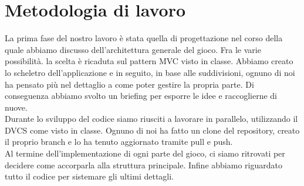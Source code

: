 \documentclass[a4paper,12pt]{report}
\begin{document}
\section{Metodologia di lavoro}
La prima fase del nostro lavoro è stata quella di progettazione nel corso della quale abbiamo discusso dell'architettura generale del gioco. Fra le varie possibilità. la scelta è ricaduta sul pattern MVC visto in classe.
Abbiamo creato lo scheletro dell'applicazione e in seguito, in base alle suddivisioni, ognuno di noi ha pensato più nel dettaglio a come poter gestire la propria parte. Di conseguenza abbiamo svolto un briefing per esporre le idee e raccoglierne di nuove.\\
Durante lo sviluppo del codice siamo riusciti a lavorare in parallelo, utilizzando il DVCS come visto in classe. Ognuno di noi ha fatto un clone del repository, creato il proprio branch e lo ha tenuto aggiornato tramite pull e push.\\
Al termine dell’implementazione di ogni parte del gioco, ci siamo ritrovati per decidere come accorparla alla struttura principale. Infine abbiamo riguardato tutto il codice per sistemare gli ultimi dettagli.
%
\\ \\ 
\end{document}

